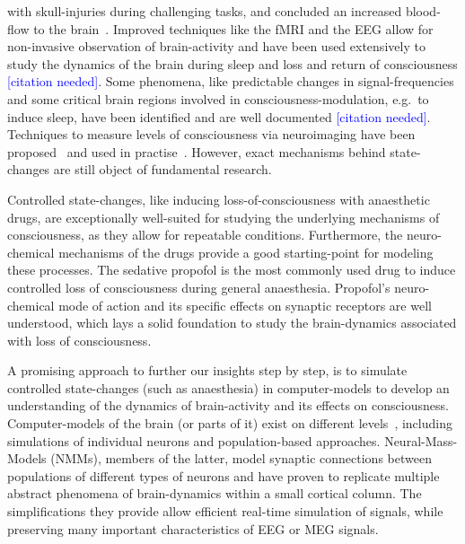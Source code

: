 with skull-injuries during challenging tasks,
and concluded an increased blood-flow to the brain~\cite{mosso_ueber_1881}.
Improved techniques like the fMRI and the EEG allow for non-invasive observation of brain-activity and have been
used extensively to study the dynamics of the brain during sleep and loss and return of consciousness
\textcolor{blue}{[citation needed]}.
Some phenomena, like predictable changes in signal-frequencies and some critical brain regions involved in
consciousness-modulation, e.g.\ to induce sleep, have been identified and are well documented
\textcolor{blue}{[citation
needed]}.
Techniques to measure levels of consciousness via neuroimaging have been proposed~\cite{sigl_introduction_1994,
    casali_theoretically_2013} and used in practise~\cite{mathur_bispectral_2022}.
However, exact mechanisms behind state-changes are still object of fundamental research.

Controlled state-changes, like inducing loss-of-consciousness with anaesthetic drugs,
are exceptionally well-suited for studying the underlying mechanisms of consciousness,
as they allow for repeatable conditions.
Furthermore, the neuro-chemical mechanisms of the drugs provide a good starting-point for modeling these processes.
The sedative propofol is the most commonly used drug to induce controlled loss of consciousness
during general anaesthesia.
Propofol's neuro-chemical mode of action and its specific effects on synaptic receptors are well understood,
which lays a solid foundation to study the brain-dynamics associated with loss of consciousness.

A promising approach to further our insights step by step, is to simulate controlled state-changes
(such as anaesthesia) in computer-models to develop an understanding of the dynamics of brain-activity and its
effects on consciousness. %
Computer-models of the brain (or parts of it) exist on different levels~\cite{panahi_generative_2021},
including simulations of individual neurons and population-based approaches.
Neural-Mass-Models (NMMs), members of the latter, model synaptic connections between populations of different types
of neurons and have proven to replicate multiple abstract phenomena of brain-dynamics\cite{bojak_neural_2014,
    knösche_jansen-rit_2014} within a small cortical
column.
The simplifications they provide allow efficient real-time simulation of signals,
while preserving many important characteristics of EEG or MEG signals.

